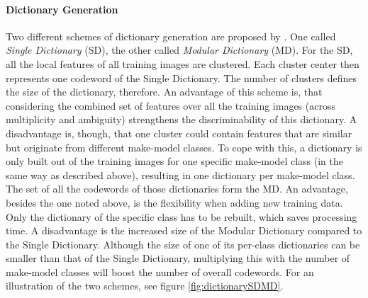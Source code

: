 \paragraph{Dictionary Generation}\label{par:dictionaryGenerationStateOfTheArt}
Two different schemes of dictionary generation are proposed by \citeauthor{siddiqui2015robust}. One called \emph{Single Dictionary} (SD), the other called \emph{Modular Dictionary} (MD). For the SD, all the local features of all training images are clustered. Each cluster center then represents one codeword of the Single Dictionary. The number of clusters defines the size of the dictionary, therefore. An advantage of this scheme is, that considering the combined set of features over all the training images (across multiplicity and ambiguity) strengthens the discriminability of this dictionary. A disadvantage is, though, that one cluster could contain features that are similar but originate from different make-model classes. To cope with this, a dictionary is only built out of the training images for one specific make-model class (in the same way as described above), resulting in one dictionary per make-model class. The set of all the codewords of those dictionaries form the MD. An advantage, besides the one noted above, is the flexibility when adding new training data. Only the dictionary of the specific class has to be rebuilt, which saves processing time. A disadvantage is the increased size of the Modular Dictionary compared to the Single Dictionary. Although the size of one of its per-class dictionaries can be smaller than that of the Single Dictionary, multiplying this with the number of make-model classes will boost the number of overall codewords. For an illustration of the two schemes, see figure \ref{fig:dictionarySDMD}.

